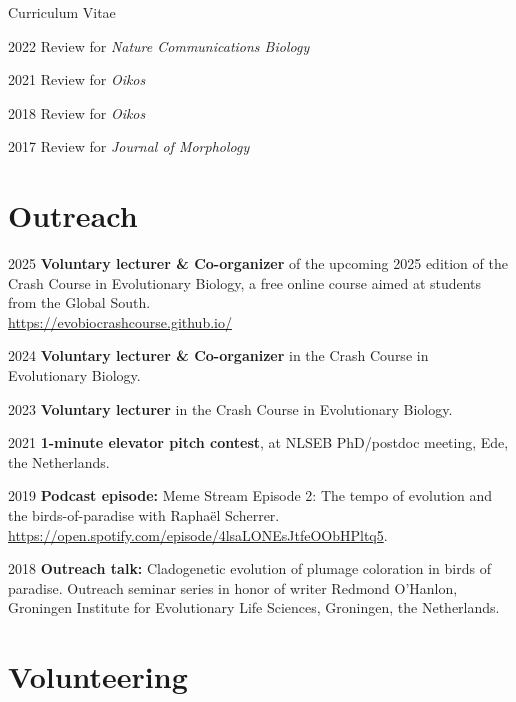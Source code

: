 \documentclass[11pt,a4paper]{article}
\begin{document}
\begin{cv}{Curriculum Vitae}
		\begin{cvlist}{}
		\item[2022] Review for \textit{Nature Communications Biology}
		\item[2021] Review for \textit{Oikos}
		\item[2018] Review for \textit{Oikos}
		\item[2017] Review for \textit{Journal of Morphology}
		\end{cvlist}
		
		\section{Outreach}
		
		\begin{cvlist}{}

            \item[2025] \textbf{Voluntary lecturer \& Co-organizer} of the upcoming 2025 edition of the Crash Course in Evolutionary Biology, a free online course aimed at students from the Global South.\\
            \url{https://evobiocrashcourse.github.io/}

            \item[2024] \textbf{Voluntary lecturer \& Co-organizer} in the Crash Course in Evolutionary Biology.
            
			\item[2023] \textbf{Voluntary lecturer} in the Crash Course in Evolutionary Biology.
			
			\item[2021] \textbf{1-minute elevator pitch contest}, at NLSEB PhD/postdoc meeting, Ede, the Netherlands.
			
			\item[2019] \textbf{Podcast episode:} Meme Stream Episode 2: The tempo of evolution and the birds-of-paradise with Raphaël Scherrer.\\
			\url{https://open.spotify.com/episode/4lsaLONEsJtfeOObHPltq5}.
			
			\item[2018] \textbf{Outreach talk:} Cladogenetic evolution of plumage coloration in birds of paradise. Outreach seminar series in honor of writer Redmond O'Hanlon, Groningen Institute for Evolutionary Life Sciences, Groningen, the Netherlands.
	
		\end{cvlist}
		
		\section{Volunteering}
		

\end{cv}
\end{document}
